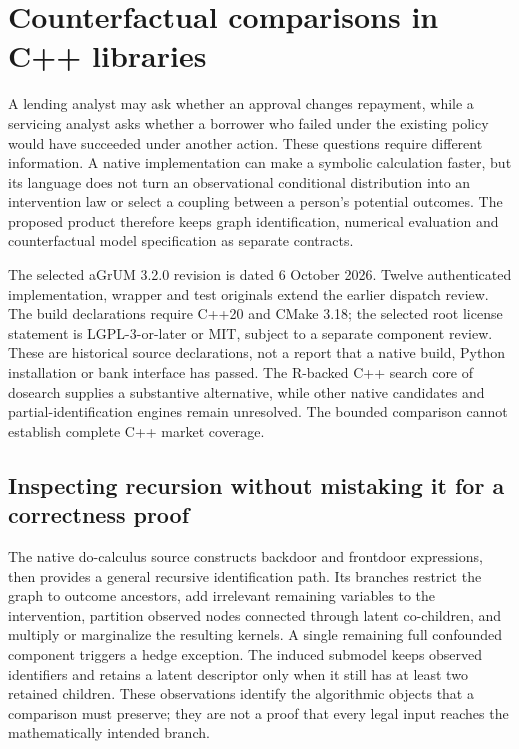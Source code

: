 \section{Counterfactual comparisons in C++ libraries}
\label{exec19:cxxid-scope}
A lending analyst may ask whether an approval changes repayment, while a
servicing analyst asks whether a borrower who failed under the existing policy
would have succeeded under another action. These questions require different
information. A native implementation can make a symbolic calculation faster,
but its language does not turn an observational conditional distribution into
an intervention law or select a coupling between a person's potential outcomes.
The proposed product therefore keeps graph identification, numerical evaluation
and counterfactual model specification as separate contracts.

The selected aGrUM 3.2.0 revision is dated 6 October 2026. Twelve authenticated
implementation, wrapper and test originals extend the earlier dispatch review.
The build declarations require C++20 and CMake 3.18; the selected root license
statement is LGPL-3-or-later or MIT, subject to a separate component review.
These are historical source declarations, not a report that a native build,
Python installation or bank interface has passed. The R-backed C++ search core
of dosearch supplies a substantive alternative, while other native candidates
and partial-identification engines remain unresolved. The bounded comparison
cannot establish complete C++ market coverage.
\citep{exec19_cxx_identification_source,exec18_rid_dosearch}

\subsection{Inspecting recursion without mistaking it for a correctness proof}
\label{exec19:cxxid-recursion}
The native do-calculus source constructs backdoor and frontdoor expressions,
then provides a general recursive identification path. Its branches restrict
the graph to outcome ancestors, add irrelevant remaining variables to the
intervention, partition observed nodes connected through latent co-children,
and multiply or marginalize the resulting kernels. A single remaining full
confounded component triggers a hedge exception. The induced submodel keeps
observed identifiers and retains a latent descriptor only when it still has at
least two retained children. These observations identify the algorithmic
objects that a comparison must preserve; they are not a proof that every legal
input reaches the mathematically intended branch.
\citep{exec19_cxx_identification_source}

